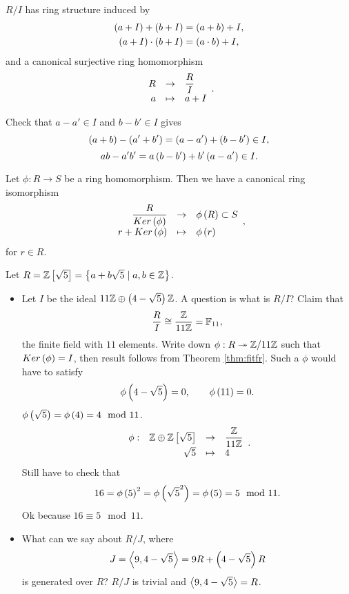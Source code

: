 \begin{proposition}
$ R / I $ has ring structure induced by
\begin{align*}
\left( a + I \right) + \left( b + I \right) & = \left( a + b \right) + I, \\
\left( a + I \right) \cdot \left( b + I \right) & = \left( a \cdot b \right) + I,
\end{align*}
and a canonical surjective ring homomorphism
$$ \function{R}{\dfrac{R}{I}}{a}{a + I}. $$
\end{proposition}

Check that $ a - a' \in I $ and $ b - b' \in I $ gives
$$ \left( a + b \right) - \left( a' + b' \right) = \left( a - a' \right) + \left( b - b' \right) \in I, $$
$$ ab - a'b' = a\left( b - b' \right) + b'\left( a - a' \right) \in I. $$

\begin{theorem}
\label{thm:fitfr}
Let $ \phi : R \to S $ be a ring homomorphism. Then we have a canonical ring isomorphism
$$ \function{\dfrac{R}{Ker\rb{\phi}}}{\phi\rb{R} \subset S}{r + Ker\rb{\phi}}{\phi\rb{r}}, $$
for $ r \in R $.
\end{theorem}

\begin{example*}
Let $ R = \mathbb{Z}\left[ \sqrt{5} \right] = \left\{ a + b\sqrt{5} \mid a, b \in \mathbb{Z} \right\} $.
\begin{itemize}
\item Let $ I $ be the ideal $ 11\mathbb{Z} \oplus \left( 4 - \sqrt{5} \right)\mathbb{Z} $. A question is what is $ R / I $? Claim that
$$ \dfrac{R}{I} \cong \dfrac{\mathbb{Z}}{11\mathbb{Z}} = \mathbb{F}_{11}, $$
the finite field with $ 11 $ elements. Write down $ \phi : R \twoheadrightarrow \mathbb{Z} / 11\mathbb{Z} $ such that $ Ker\left( \phi \right) = I $, then result follows from Theorem \ref{thm:fitfr}. Such a $ \phi $ would have to satisfy
$$ \phi\left( 4 - \sqrt{5} \right) = 0, \qquad \phi\left( 11 \right) = 0. $$
$ \phi\left( \sqrt{5} \right) = \phi\left( 4 \right) = 4 \mod 11 $.
$$ \function[\phi]{\Z \oplus \Z\sb{\sqrt{5}}}{\dfrac{\Z}{11\Z}}{\sqrt{5}}{4}. $$
Still have to check that
$$ 16 = \phi\left( 5 \right)^2 = \phi\left( \sqrt{5}^2 \right) = \phi\left( 5 \right) = 5 \mod 11. $$
Ok because $ 16 \equiv 5 \mod 11 $.
\item What can we say about $ R / J $, where
$$ J = \left\langle 9, 4 - \sqrt{5} \right\rangle = 9R + \left( 4 - \sqrt{5} \right)R $$
is generated over $ R $? $ R / J $ is trivial and $ \left\langle 9, 4 - \sqrt{5} \right\rangle = R $.
\end{itemize}
\end{example*}

